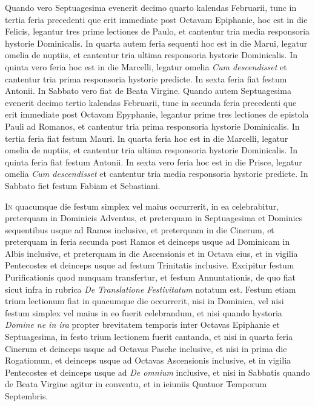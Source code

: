 \begin{multicols*}{2}
Quando vero Septuagesima evenerit decimo quarto kalendas Februarii, tunc in tertia feria precedenti que erit immediate post Octavam Epiphanie, hoc est in die Felicis, legantur tres prime lectiones de Paulo, et cantentur tria media responsoria hystorie Dominicalis. In quarta autem feria sequenti hoc est in die Marui, legatur omelia de nuptiis, et cantentur tria ultima responsoria hystorie Dominicalis. In quinta vero feria hoc est in die Marcelli, legatur omelia \textit{Cum descendisset} et cantentur tria prima responsoria hystorie predicte. In sexta feria fiat festum Antonii. In Sabbato vero fiat de Beata Virgine.
Quando autem Septuagesima evenerit decimo tertio kalendas Februarii, tunc in secunda feria precedenti que erit immediate post Octavam Epyphanie, legantur prime tres lectiones de epistola Pauli ad Romanos, et cantentur tria prima responsoria hystorie Dominicalis. In tertia feria fiat festum Mauri. In quarta feria hoc est in die Marcelli, legatur omelia de nuptiis, et cantentur tria ultima responsoria hystorie Dominicalis. In quinta feria fiat festum Antonii. In sexta vero feria hoc est in die Prisce, legatur omelia \textit{Cum descendisset} et cantentur tria media responsoria hystorie predicte. In Sabbato fiet festum Fabiam et Sebastiani.



{\color{Red}}


{\color{Red} }
\lettrine[lines=2]{\zallmancaps \color{Red} I}{n} quacumque die festum simplex vel maius occurrerit, in ea celebrabitur, preterquam in Dominicis Adventus, et preterquam in Septuagesima et Dominics sequentibus usque ad Ramos inclusive, et preterquam in die Cinerum, et preterquam in feria secunda post Ramos et deinceps usque ad Dominicam in Albis inclusive, et preterquam in die Ascensionis et in Octava eius, et in vigilia Pentecostes et deinceps usque ad festum Trinitatis inclusive. Excipitur festum Purificationis quod nunquam transfertur, et festum Annuntationis, de quo fiat sicut infra in rubrica \textit{De Translatione Festivitatum} notatum est.
Festum etiam trium lectionum fiat in quacumque die occurrerit, nisi in Dominica, vel nisi festum simplex vel maius in eo fuerit celebrandum, et nisi quando hystoria \textit{Domine ne in ira} propter brevitatem temporis inter Octavas Epiphanie et Septuagesima, in festo trium lectionem fuerit cantanda, et nisi in quarta feria Cinerum et deinceps usque ad Octavas Pasche inclusive, et nisi in prima die Rogationum, et deinceps usque ad Octavas Ascensionis inclusive, et in vigilia Pentecostes et deinceps usque ad \textit{De omnium} inclusive, et nisi in Sabbatis quando de Beata Virgine agitur in conventu, et in ieiuniis Quatuor Temporum Septembris.


\end{multicols*}
